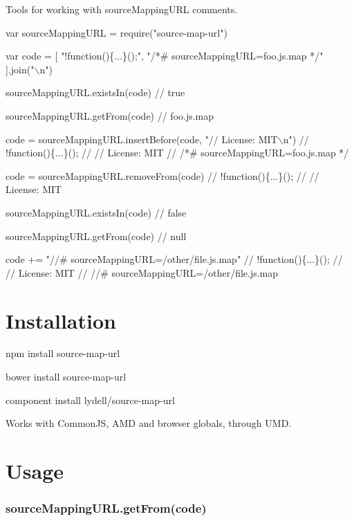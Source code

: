 \href{https://ci.testling.com/lydell/source-map-url}{\tt }

Tools for working with source\+Mapping\+U\+RL comments.


\begin{DoxyCode}
var sourceMappingURL = require("source-map-url")

var code = [
  "!function()\{...\}();",
  "/*# sourceMappingURL=foo.js.map */"
].join("\(\backslash\)n")

sourceMappingURL.existsIn(code)
// true

sourceMappingURL.getFrom(code)
// foo.js.map

code = sourceMappingURL.insertBefore(code, "// License: MIT\(\backslash\)n")
// !function()\{...\}();
// // License: MIT
// /*# sourceMappingURL=foo.js.map */

code = sourceMappingURL.removeFrom(code)
// !function()\{...\}();
// // License: MIT

sourceMappingURL.existsIn(code)
// false

sourceMappingURL.getFrom(code)
// null

code += "//# sourceMappingURL=/other/file.js.map"
// !function()\{...\}();
// // License: MIT
// //# sourceMappingURL=/other/file.js.map
\end{DoxyCode}


\section*{Installation }


\begin{DoxyItemize}
\item {\ttfamily npm install source-\/map-\/url}
\item {\ttfamily bower install source-\/map-\/url}
\item {\ttfamily component install lydell/source-\/map-\/url}
\end{DoxyItemize}

Works with Common\+JS, A\+MD and browser globals, through U\+MD.

\section*{Usage }

\subsubsection*{{\ttfamily source\+Mapping\+U\+R\+L.\+get\+From(code)}}

